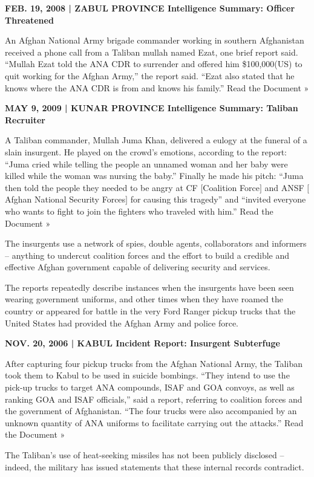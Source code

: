 ﻿\documentclass[12pt]{article}
\begin{document}
\textbf{FEB. 19, 2008 | ZABUL PROVINCE Intelligence Summary: Officer Threatened}

An Afghan National Army brigade commander working in southern Afghanistan received a phone call from
a Taliban mullah named Ezat, one brief report said. ``Mullah Ezat told the ANA CDR to surrender and
offered him \$100,000(US) to quit working for the Afghan Army,'' the report said. ``Ezat also stated
that he knows where the ANA CDR is from and knows his family.'' Read the Document »

\textbf{MAY 9, 2009 | KUNAR PROVINCE Intelligence Summary: Taliban Recruiter}

A Taliban commander, Mullah Juma Khan, delivered a eulogy at the funeral of a slain insurgent. He
played on the crowd's emotions, according to the report: ``Juma cried while telling the people an
unnamed woman and her baby were killed while the woman was nursing the baby.'' Finally he made his
pitch: ``Juma then told the people they needed to be angry at CF $[$Coalition Force$]$ and ANSF
$[$Afghan National Security Forces$]$ for causing this tragedy'' and ``invited everyone who wants to
fight to join the fighters who traveled with him.'' Read the Document »

The insurgents use a network of spies, double agents, collaborators and informers -- anything to
undercut coalition forces and the effort to build a credible and effective Afghan government capable
of delivering security and services.

The reports repeatedly describe instances when the insurgents have been seen wearing government
uniforms, and other times when they have roamed the country or appeared for battle in the very Ford
Ranger pickup trucks that the United States had provided the Afghan Army and police force.

\textbf{NOV. 20, 2006 | KABUL Incident Report: Insurgent Subterfuge}

After capturing four pickup trucks from the Afghan National Army, the Taliban took them to Kabul to
be used in suicide bombings. ``They intend to use the pick-up trucks to target ANA compounds, ISAF
and GOA convoys, as well as ranking GOA and ISAF officials,'' said a report, referring to coalition
forces and the government of Afghanistan. ``The four trucks were also accompanied by an unknown
quantity of ANA uniforms to facilitate carrying out the attacks.'' Read the Document »

The Taliban's use of heat-seeking missiles has not been publicly disclosed -- indeed, the military
has issued statements that these internal records contradict.
\end{document}
